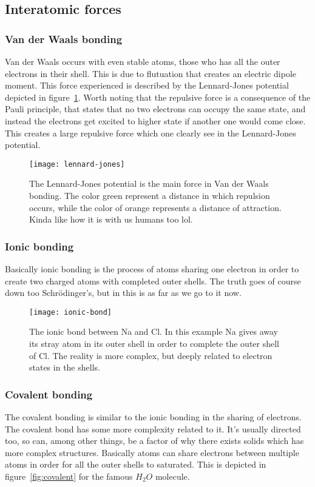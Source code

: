 \documentclass[11pt]{article}
\begin{document}
\newpage
\subsection{Interatomic forces}
\subsubsection{Van der Waals bonding}
Van der Waals occurs with even stable atoms, those who has all the outer electrons in their shell. This is due to flutuation that creates an electric dipole moment. This force experienced is described by the Lennard-Jones potential depicted in figure~\ref{fig:lennard-jones}. Worth noting that the repulsive force is a consequence of the Pauli principle, that states that no two electrons can occupy the same state, and instead the electrons get excited to higher state if another one would come close. This creates a large repulsive force which one clearly see in the Lennard-Jones potential.
\begin{figure}[!ht]
	\centering
	\texttt{[image: lennard-jones]}
	\caption{The Lennard-Jones potential is the main force in Van der Waals bonding. The color green represent a distance in which repulsion occurs, while the color of orange represents a distance of attraction. Kinda like how it is with us humans too lol.}
	\label{fig:lennard-jones}
\end{figure}

\newpage
\subsubsection{Ionic bonding}
Basically ionic bonding is the process of atoms sharing one electron in order to create two charged atoms with completed outer shells. The truth goes of course down too Schrödinger's, but in this is as far as we go to it now.
\begin{figure}[!ht]
	\centering
	\texttt{[image: ionic-bond]}
	\caption{The ionic bond between Na and Cl. In this example Na gives away its stray atom in its outer shell in order to complete the outer shell of Cl. The reality is more complex, but deeply related to electron states in the shells.}
	\label{fig:ionic-bond}
\end{figure}

\newpage
\subsubsection{Covalent bonding}
The covalent bonding is similar to the ionic bonding in the sharing of electrons. The covalent bond has some more complexity related to it. It's usually directed too, so can, among other things, be a factor of why there exists solids which has more complex structures. Basically atoms can share electrons between multiple atoms in order for all the outer shells to saturated. This is depicted in figure~\ref{fig:covalent} for the famous $H_2O$ molecule.
\end{document}
